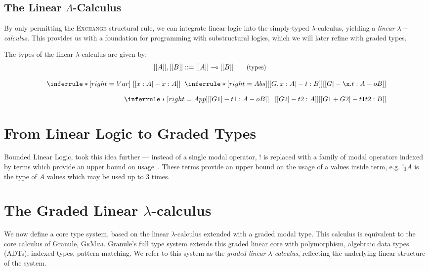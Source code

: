 

\subsection{The Linear $\Lambda$-Calculus}
By only permitting the \textsc{Exchange} structural rule, we can integrate linear logic into 
the simply-typed $\lambda$-calculus, yielding a \emph{linear $\lambda-$calculus}. This provides 
us with a foundation for programming with substructural logics, which we will later refine with graded
types. 

The types of the linear $\lambda$-calculus are given by: 
\begin{align*}
  \hspace{-0.9em}[[ A ]] , [[ B ]] & ::=
         [[ A ]] \multimap [[ B ]]
  {\small{\tag{types}}}
\end{align*}

\begin{align*}
\inferrule*[right = Var]
{\;}
{[[ x : A |- x : A ]]}
\;\;
\inferrule*[right = Abs]
{[[ G , x : A |- t : B ]]}
{[[ G |- \x . t : A -o B ]]}
\\[0.75em]
\inferrule*[right = App]
{[[ G1 |- t1 : A -o B ]] \;\;\;
 [[ G2 |- t2 : A ]] }
{[[ G1 + G2 |- t1 t2 : B ]]}
\end{align*}


\section{From Linear Logic to Graded Types}

Bounded Linear Logic, took this idea further --- instead of a single modal
operator, $!$ is replaced with a family of modal operators indexed by terms
which provide an upper bound on usage~\cite{}. These terms provide an upper bound on
the usage of a values inside term, e.g. $!_{3}A$ is the type of $A$ values which
may be used up to 3 times.

\section{The Graded Linear $\lambda$-calculus}
\label{sec:linear-base}
We now define a core type system, based on the linear
$\lambda$-calculus extended with a graded modal type. 
This calculus is equivalent to the core calculus of Granule,
\textsc{GrMini}\cite{}. Granule's full type system extends this
graded linear core with polymorphism, algebraic data types (ADTs), indexed types, pattern
matching. We refer to this system as the \textit{graded linear $\lambda$-calculus}, reflecting the underlying
linear structure of the system.

